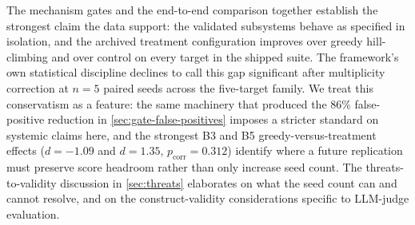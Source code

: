 The mechanism gates and the end-to-end comparison together establish the strongest claim the data support: the validated subsystems behave as specified in isolation, and the archived treatment configuration improves over greedy hill-climbing and over control on every target in the shipped suite.
The framework's own statistical discipline declines to call this gap significant after multiplicity correction at $n = 5$ paired seeds across the five-target family.
We treat this conservatism as a feature: the same machinery that produced the 86\% false-positive reduction in \cref{sec:gate-false-positives} imposes a stricter standard on systemic claims here, and the strongest B3 and B5 greedy-versus-treatment effects ($d = -1.09$ and $d = 1.35$, $p_{\text{corr}} = 0.312$) identify where a future replication must preserve score headroom rather than only increase seed count.
The threats-to-validity discussion in \cref{sec:threats} elaborates on what the seed count can and cannot resolve, and on the construct-validity considerations specific to LLM-judge evaluation.
